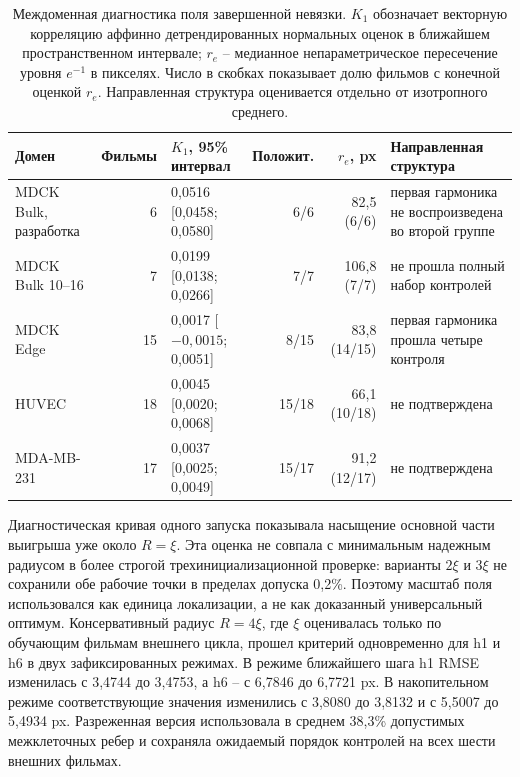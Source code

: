 \documentclass[11pt,a4paper]{article}
\begin{document}
\begin{table}[H]
\centering
\caption{Междоменная диагностика поля завершенной невязки. $K_1$ обозначает векторную корреляцию аффинно детрендированных нормальных оценок в ближайшем пространственном интервале; $r_e$ -- медианное непараметрическое пересечение уровня $e^{-1}$ в пикселях. Число в скобках показывает долю фильмов с конечной оценкой $r_e$. Направленная структура оценивается отдельно от изотропного среднего.}
\label{tab:field_domains}
\scriptsize
\setlength{\tabcolsep}{3.5pt}
\begin{tabularx}{\textwidth}{@{}L{0.19\textwidth} r L{0.24\textwidth} r r Y@{}}
\toprule
Домен & Фильмы & $K_1$, 95\% интервал & Положит. & $r_e$, px & Направленная структура \\
\midrule
MDCK Bulk, разработка & 6 & 0{,}0516 [0{,}0458; 0{,}0580] & 6/6 & 82{,}5 (6/6) & первая гармоника не воспроизведена во второй группе \\
MDCK Bulk 10--16 & 7 & 0{,}0199 [0{,}0138; 0{,}0266] & 7/7 & 106{,}8 (7/7) & не прошла полный набор контролей \\
MDCK Edge & 15 & 0{,}0017 [$-0{,}0015$; 0{,}0051] & 8/15 & 83{,}8 (14/15) & первая гармоника прошла четыре контроля \\
HUVEC & 18 & 0{,}0045 [0{,}0020; 0{,}0068] & 15/18 & 66{,}1 (10/18) & не подтверждена \\
MDA-MB-231 & 17 & 0{,}0037 [0{,}0025; 0{,}0049] & 15/17 & 91{,}2 (12/17) & не подтверждена \\
\bottomrule
\end{tabularx}
\end{table}

Диагностическая кривая одного запуска показывала насыщение основной части выигрыша уже около $R=\xi$. Эта оценка не совпала с минимальным надежным радиусом в более строгой трехинициализационной проверке: варианты $2\xi$ и $3\xi$ не сохранили обе рабочие точки в пределах допуска 0,2\%. Поэтому масштаб поля использовался как единица локализации, а не как доказанный универсальный оптимум. Консервативный радиус $R=4\xi$, где $\xi$ оценивалась только по обучающим фильмам внешнего цикла, прошел критерий одновременно для h1 и h6 в двух зафиксированных режимах. В режиме ближайшего шага h1 RMSE изменилась с 3,4744 до 3,4753, а h6 -- с 6,7846 до 6,7721 px. В накопительном режиме соответствующие значения изменились с 3,8080 до 3,8132 и с 5,5007 до 5,4934 px. Разреженная версия использовала в среднем 38,3\% допустимых межклеточных ребер и сохраняла ожидаемый порядок контролей на всех шести внешних фильмах.
\end{document}
